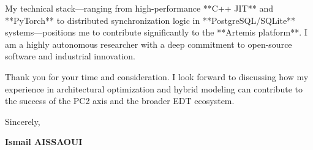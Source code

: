 \documentclass[a4paper,12pt]{article}
\begin{document}
My technical stack—ranging from high-performance **C++ JIT** and **PyTorch** to distributed synchronization logic in **PostgreSQL/SQLite** systems—positions me to contribute significantly to the **Artemis platform**. I am a highly autonomous researcher with a deep commitment to open-source software and industrial innovation.

Thank you for your time and consideration. I look forward to discussing how my experience in architectural optimization and hybrid modeling can contribute to the success of the PC2 axis and the broader EDT ecosystem.

Sincerely,

\bigskip

\textbf{Ismail AISSAOUI}
\end{document}
